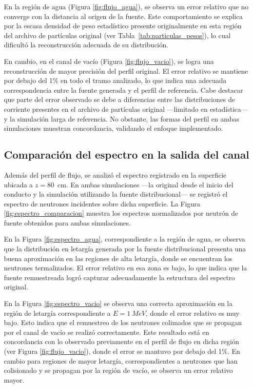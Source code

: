 En la región de agua (Figura \ref{fig:flujo_agua}), se observa un error relativo que no converge con la distancia al origen de la fuente. Este comportamiento se explica por la escasa densidad de peso estadístico presente originalmente en esta región del archivo de partículas original (ver Tabla~\ref{tab:particulas_pesos}), lo cual dificultó la reconstrucción adecuada de su distribución.

En cambio, en el canal de vacío (Figura \ref{fig:flujo_vacio}), se logra una reconstrucción de mayor precisión del perfil original. El error relativo se mantiene por debajo del 1\% en todo el tramo analizado, lo que indica una adecuada correspondencia entre la fuente generada y el perfil de referencia. Cabe destacar que parte del error observado se debe a diferencias entre las distribuciones de corriente presentes en el archivo de partículas original —limitado en estadística— y la simulación larga de referencia. No obstante, las formas del perfil en ambas simulaciones muestran concordancia, validando el enfoque implementado.

\subsection{Comparación del espectro en la salida del canal}

Además del perfil de flujo, se analizó el espectro registrado en la superficie ubicada a $z = 80$~cm. En ambas simulaciones —la original desde el inicio del conducto y la simulación utilizando la fuente distribucional— se registró el espectro de neutrones incidentes sobre dicha superficie. La Figura \ref{fig:espectro_comparacion} muestra los espectros normalizados por neutrón de fuente obtenidos para ambas simulaciones. 

En la Figura \ref{fig:espectro_agua}, correspondiente a la región de agua, se observa que la distribución en letargía generada por la fuente distribucional presenta una buena aproximación en las regiones de alta letargía, donde se encuentran los neutrones termalizados. El error relativo en esa zona es bajo, lo que indica que la fuente remuestreada logró capturar adecuadamente la estructura del espectro original.

En la Figura \ref{fig:espectro_vacio} se observa una correcta aproximación en la región de letargía correspondiente a $E = 1~MeV$, donde el error relativo es muy bajo. Esto indica que el remuestreo de los neutrones colimados que se propagan por el canal de vacío se realizó correctamente. Este resultado está en concordancia con lo observado previamente en el perfil de flujo en dicha región (ver Figura \ref{fig:flujo_vacio}), donde el error se mantuvo por debajo del 1\%. En cambio para regiones de mayor letargía, correspondientes a neutrones que han colisionado y se propagan por la región de vacío, se observa un error relativo mayor. 

